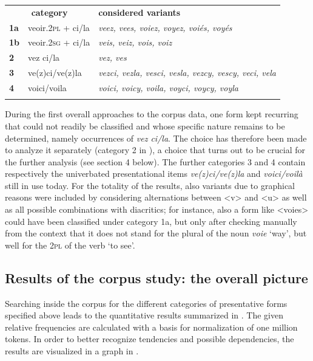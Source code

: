 \documentclass[output=paper]{langscibook}
\begin{document}
\begin{itemize}
\begin{itemize}
\begin{itemize}
\begin{itemize}
\begin{itemize}
\begin{itemize}
\begin{itemize}
\begin{tabularx}{\textwidth}{XXX}
\multicolumn{2}{c}{{\bfseries category}} & {\bfseries considered variants}\\
\textbf{1a} & veoir.\textsc{2pl} + ci/la & \textit{veez, vees, voiez, voyez, voiés, voyés}\\
\textbf{1b} & veoir.\textsc{2sg} + ci/la & \textit{veis, veiz, vois, voiz}\\
\textbf{2} & vez ci/la & \textit{vez, ves}\\
\textbf{3} & ve(z)ci/ve(z)la & \textit{vezci, vezla, vesci, vesla, vezcy, vescy, veci, vela}\\
\textbf{4} & voici/voila & \textit{voici, voicy, voila, voyci, voycy, voyla}\\
\lspbottomrule
\end{tabularx}
\begin{table}
\caption{Categorization of presentative forms applied during the corpus study.}
\label{tab:key:2}
\end{table}

During the first overall approaches to the corpus data, one form kept recurring that could not readily be classified and whose specific nature remains to be determined, namely occurrences of \textit{vez ci/la}. The choice has therefore been made to analyze it separately (category 2 in ), a choice that turns out to be crucial for the further analysis (see section 4 below). The further categories 3 and 4 contain respectively the univerbated presentational items \textit{ve(z)ci/ve(z)la} and \textit{voici/voilà} still in use today. For the totality of the results, also variants due to graphical reasons were included by considering alternations between <v> and <u> as well as all possible combinations with diacritics; for instance, also a form like <voies> could have been classified under category 1a, but only after checking manually from the context that it does not stand for the plural of the noun \textit{voie} ‘way’, but well for the \textsc{2pl} of the verb ‘to see’. 

\subsection{Results of the corpus study: the overall picture}

Searching inside the corpus for the different categories of presentative forms specified above leads to the quantitative results summarized in . The given relative frequencies are calculated with a basis for normalization of one million tokens. In order to better recognize tendencies and possible dependencies, the results are visualized in a graph in . 



\end{itemize}
\end{itemize}
\end{itemize}
\end{itemize}
\end{itemize}
\end{itemize}
\end{itemize}
\end{document}
